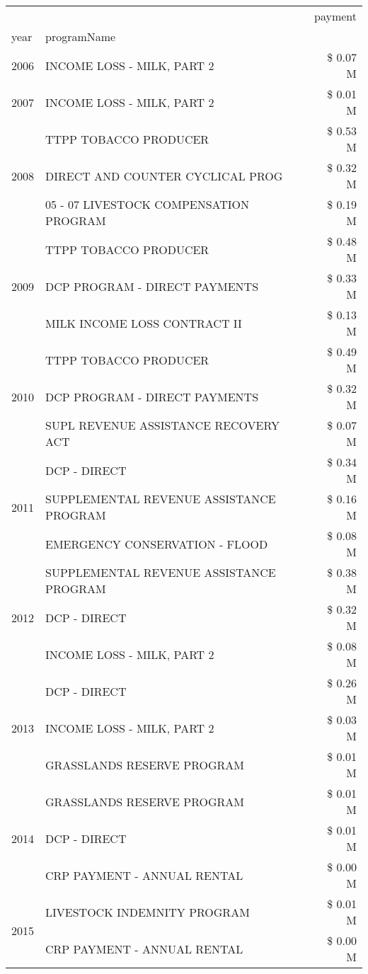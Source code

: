 \begin{tabular}{llr}
\toprule
 &  & payment \\
year & programName &  \\
\midrule
2006 & INCOME LOSS - MILK, PART 2 & \$ 0.07 M \\
\cline{1-3}
2007 & INCOME LOSS - MILK, PART 2 & \$ 0.01 M \\
\cline{1-3}
\multirow[t]{3}{*}{2008} & TTPP TOBACCO PRODUCER & \$ 0.53 M \\
 & DIRECT AND COUNTER CYCLICAL PROG & \$ 0.32 M \\
 & 05 - 07 LIVESTOCK COMPENSATION PROGRAM & \$ 0.19 M \\
\cline{1-3}
\multirow[t]{3}{*}{2009} & TTPP TOBACCO PRODUCER & \$ 0.48 M \\
 & DCP PROGRAM - DIRECT PAYMENTS & \$ 0.33 M \\
 & MILK INCOME LOSS CONTRACT II & \$ 0.13 M \\
\cline{1-3}
\multirow[t]{3}{*}{2010} & TTPP TOBACCO PRODUCER & \$ 0.49 M \\
 & DCP PROGRAM - DIRECT PAYMENTS & \$ 0.32 M \\
 & SUPL REVENUE ASSISTANCE RECOVERY ACT & \$ 0.07 M \\
\cline{1-3}
\multirow[t]{3}{*}{2011} & DCP - DIRECT & \$ 0.34 M \\
 & SUPPLEMENTAL REVENUE ASSISTANCE PROGRAM & \$ 0.16 M \\
 & EMERGENCY CONSERVATION - FLOOD & \$ 0.08 M \\
\cline{1-3}
\multirow[t]{3}{*}{2012} & SUPPLEMENTAL REVENUE ASSISTANCE PROGRAM & \$ 0.38 M \\
 & DCP - DIRECT & \$ 0.32 M \\
 & INCOME LOSS - MILK, PART 2 & \$ 0.08 M \\
\cline{1-3}
\multirow[t]{3}{*}{2013} & DCP - DIRECT & \$ 0.26 M \\
 & INCOME LOSS - MILK, PART 2 & \$ 0.03 M \\
 & GRASSLANDS RESERVE PROGRAM & \$ 0.01 M \\
\cline{1-3}
\multirow[t]{3}{*}{2014} & GRASSLANDS RESERVE PROGRAM & \$ 0.01 M \\
 & DCP - DIRECT & \$ 0.01 M \\
 & CRP PAYMENT - ANNUAL RENTAL & \$ 0.00 M \\
\cline{1-3}
\multirow[t]{3}{*}{2015} & LIVESTOCK INDEMNITY PROGRAM & \$ 0.01 M \\
 & CRP PAYMENT - ANNUAL RENTAL & \$ 0.00 M \\

\end{tabular}
